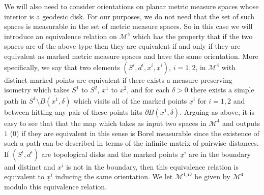 \documentclass[JEP,XML,SOM,Unicode]{cedram}
\let\mathcal\mathscr
\theoremstyle{plain}
\numberwithin{theorem}{section}
\theoremstyle{definition}
\newcommand\mmspace{{\mathcal M}}
\let\ol\overline
\let\ul\underline
\begin{document}
We will also need to consider orientations on planar metric measure spaces whose interior is a geodesic disk. For our purposes, we do not need that the set of such spaces is measurable in the set of metric measure spaces. So in this case we will introduce an equivalence relation on $\mmspace^4$ which has the property that if the two spaces are of the above type then they are equivalent if and only if they are equivalent as marked metric measure spaces and have the same orientation. More specifically, we say that two elements $(S^i,d^i,x^i,\ul{x}^i)$, $i=1,2$, in $\mmspace^4$ with distinct marked points are equivalent if there exists a measure preserving isometry which takes $S^1$ to $S^2$, $x^1$ to $x^2$, and for each $\delta > 0$ there exists a simple path in $S^1 \setminus \ol{B(x^1,\delta)}$ which visits all of the marked points $\ul{x}^i$ for $i=1,2$ and between hitting any pair of these points hits $\partial B(x^1,\delta)$. Arguing as above, it is easy to see that that the map which takes as input two spaces in $\mmspace^4$ and outputs $1$ (\resp $0$) if they are equivalent in this sense is Borel measurable since the existence of such a path can be described in terms of the infinite matrix of pairwise distances. If $(S^i,d^i)$ are topological disks and the marked points $\ul{x}^i$ are in the boundary and distinct and $x^i$ is not in the boundary, then this equivalence relation is equivalent to $\ul{x}^i$ inducing the same orientation. We let $\mmspace^{1,O}$ be given by $\mmspace^4$ modulo this equivalence relation.
\end{document}
